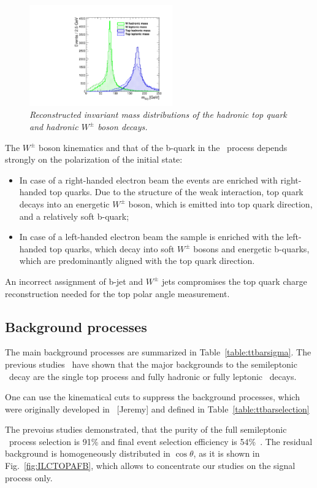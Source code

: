 \begin{figure}[h]
	{\centering
		\includegraphics[width=0.55\textwidth]{ILD/plots/top-w-mass-new.pdf}
		\caption{\sl Reconstructed invariant mass distributions of the hadronic top quark and hadronic $W^\pm$ boson decays.
		}
		\label{fig:TopWmass_3}
	}
	
\end{figure}

The $W^\pm$ boson kinematics and that of the b-quark in the \ttbar\ process depends strongly on the polarization of the initial state:
\begin{itemize}
	\item In case of a right-handed electron beam the events are enriched with right-handed top quarks. Due to the structure of the weak interaction, top quark decays into an energetic $W^\pm$ boson, which is emitted into top quark direction, and a relatively soft b-quark;
	\item In case of a left-handed electron beam the sample is enriched with the left-handed top quarks, which decay into soft $W^\pm$ bosons and energetic b-quarks, which are predominantly aligned with the top quark direction. 
\end{itemize}
An incorrect assignment of b-jet and $W^\pm$ jets compromises the top quark charge reconstruction needed for the top polar angle measurement. 

\subsection{Background processes}
The main background processes are summarized in Table~\ref{table:ttbarsigma}. 
The previous studies~\cite{bib:ILCTOP}\cite{bib:Doublet} have shown that the major backgrounds to the semileptonic \ttbar\ decay are the single top process and fully hadronic or fully leptonic \ttbar\ decays. 


One can use the kinematical cuts to suppress the background processes, which were originally developed in ~\cite{bib:Doublet}[Jeremy] and defined in Table~\ref{table:ttbarselection}

The prevoius studies demonstrated, that the purity of the full semileptonic \ttbar\ process selection is 91\% and final event selection efficiency is 54\%~\cite{bib:ILCTOP}.
The residual background is homogeneously distributed in $\cos\theta$, as it is shown in Fig.~\ref{fig:ILCTOPAFB}, which allows to concentrate our studies on the signal process only. 

